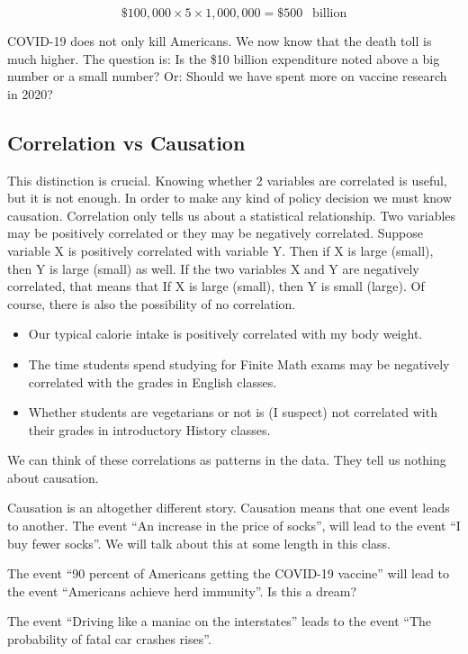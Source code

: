 \documentclass[
]{book}
\providecommand{\tightlist}{%
  \setlength{\itemsep}{0pt}\setlength{\parskip}{0pt}}
\begin{document}
\[ \$100,000 \times 5 \times 1,000,000 = \$ 500 \ \ \text{ billion} \]

COVID-19 does not only kill Americans. We now know that the death toll is much higher. The question is: Is the \$10 billion expenditure noted above a big number or a small number? Or: Should we have spent more on vaccine research in 2020?

\hypertarget{correlation-vs-causation}{%
\subsection{Correlation vs Causation}\label{correlation-vs-causation}}

This distinction is crucial. Knowing whether 2 variables are correlated is useful, but it is not enough. In order to make any kind of policy decision we must know causation. Correlation only tells us about a statistical relationship. Two variables may be positively correlated or they may be negatively correlated. Suppose variable X is positively correlated with variable Y. Then if X is large (small), then Y is large (small) as well. If the two variables X and Y are negatively correlated, that means that If X is large (small), then Y is small (large). Of course, there is also the possibility of no correlation.

\begin{itemize}
\tightlist
\item
  Our typical calorie intake is positively correlated with my body weight.
\item
  The time students spend studying for Finite Math exams may be negatively correlated with the grades in English classes.
\item
  Whether students are vegetarians or not is (I suspect) not correlated with their grades in introductory History classes.
\end{itemize}

We can think of these correlations as patterns in the data. They tell us nothing about causation.

Causation is an altogether different story. Causation means that one event leads to another. The event ``An increase in the price of socks'', will lead to the event ``I buy fewer socks''. We will talk about this at some length in this class.

The event ``90 percent of Americans getting the COVID-19 vaccine'' will lead to the event ``Americans achieve herd immunity''. Is this a dream?

The event ``Driving like a maniac on the interstates'' leads to the event ``The probability of fatal car crashes rises''.
\end{document}

